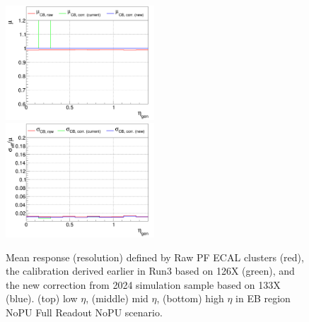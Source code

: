 \begin{figure}
\includegraphics[width=0.495\textwidth]{./plots_pdf/ECAL_plots/plotsNOPU/EB/FULL/pdf/GENETA/EBFULL_GENETA_0100_0300_MuOverBins.pdf}
\includegraphics[width=0.495\textwidth]{./plots_pdf/ECAL_plots/plotsNOPU/EB/FULL/pdf/GENETA/EBFULL_GENETA_0100_0300_EffSigmaOverBins.pdf}

\caption [$\mu$ ($\sigma_\mathrm{eff}$) vs $\eta$ of PF ECAL cluster - EB Full readout NoPU scenario.]{Mean response (resolution) defined by Raw PF ECAL clusters (red), the calibration derived earlier in Run3 based on 126X (green), and the new correction from 2024 simulation sample based on 133X (blue). (top) low $\eta$, (middle) mid $\eta$, (bottom) high $\eta$ in EB region NoPU Full Readout NoPU scenario.}
\label{fig:NOPU_EBFULL_eta}
\end{figure}









